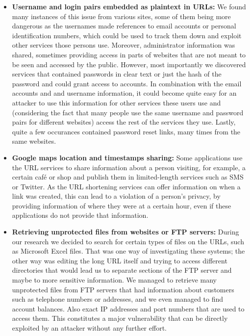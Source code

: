 \documentclass[12pt]{article}
\begin{document}
\begin{itemize}

\item \textbf{Username and login pairs embedded as plaintext in URLs:} We found many instances of this issue from various sites, some of them being more dangerous as the usernames made references to email accounts or personal identification numbers, which could be used to track them down and exploit other services those persons use. Moreover, administrator information was shared, sometimes providing access in parts of websites that are not meant to be seen and accessed by the public. However, most importantly we discovered services that contained passwords in clear text or just the hash of the password and could grant access to accounts. In combination with the email accounts and and username information, it could become quite easy for an attacker to use this information for other services these users use and (considering the fact that many people use the same username and password pairs for different websites) access the rest of the services they use. Lastly, quite a few occurances contained password reset links, many times from the same websites.

\item \textbf{Google maps location and timestamps sharing:} Some applications use the URL services to share information about a person visiting, for example, a certain café or shop and publish them in limited-length services such as SMS or Twitter. As the URL shortening services can offer information on when a link was created, this can lead to a violation of a person's privacy, by providing information of where they were at a certain hour, even if these applications do not provide that information.

\item \textbf{Retrieving unprotected files from websites or FTP servers:} During our research we decided to search for certain types of files on the URLs, such as Microsoft Excel files. That was one way of investigating these systems; the other way was editing the long URL itself and trying to access different directories that would lead us to separate sections of the FTP server and maybe to more sensitive information. We managed to retrieve many unprotected files from FTP servers that had information about customers such as telephone numbers or addresses, and we even managed to find account balances. Also exact IP addresses and port numbers that are used to access them. This constitutes a major vulnerability that can be directly exploited by an attacker without any further effort.


\end{itemize}
\end{document}

